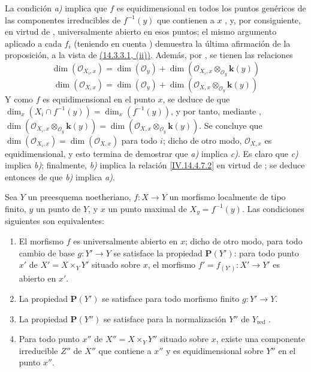 La condición \emph{a)} implica que $f$ es equidimensional en todos los puntos genéricos de las componentes irreducibles de $f^{-1}(y)$ que contienen a $x$ , y, por consiguiente, en virtud de , universalmente abierto en esos puntos; el mismo argumento aplicado a cada $f_i$ (teniendo en cuenta ) demuestra la última afirmación de la proposición, a la vista de {\hyperlink{ega4.c04.subsec.14-3-3-1}{(14.3.3.1, (ii))}}.
Además, por , se tienen las relaciones
\begin{equation}
\tag{14.4.7.1}
\label{IV.14.4.7.1-fr}
  \dim(\mathcal O_{X_i,x})=\dim(\mathcal O_y)+
  \dim(\mathcal O_{X_i,x}\otimes_{\mathcal O_y}\boldsymbol{k}(y))
\end{equation}
\begin{equation}
\tag{14.4.7.2}
\label{IV.14.4.7.2-fr}
  \dim(\mathcal O_{X,x})=\dim(\mathcal O_y)+
  \dim(\mathcal O_{X,x}\otimes_{\mathcal O_y}\boldsymbol{k}(y))
\end{equation}
Y como $f$ es equidimensional en el punto $x$, se deduce de  que $\dim_x(X_i\cap f^{-1}(y))=\dim_x(f^{-1}(y))$, y por tanto, mediante , $\dim(\mathcal O_{X_i,x}\otimes_{\mathcal O_y}\boldsymbol{k}(y))=
\dim(\mathcal O_{X,x}\otimes_{\mathcal O_y}\boldsymbol{k}(y))$.
Se concluye que $\dim(\mathcal O_{X_i,x})=\dim(\mathcal O_{X,x})$ para todo $i$; dicho de otro modo, $\mathcal O_{X,x}$ es equidimensional, y esto termina de demostrar que \emph{a)} implica \emph{c)}.
Es claro que \emph{c)} implica \emph{b)}; finalmente, \emph{b)} implica la relación \eqref{IV.14.4.7.2} en virtud de ; se deduce entonces de  que \emph{b)} implica \emph{a)}.

\begin{proposition}[14.4.8]
\label{IV.14.4.8}
Sea $Y$ un preesquema noetheriano, $f:X\to Y$ un morfismo localmente de tipo finito, $y$ un punto de $Y$, y $x$ un punto maximal de $X_y=f^{-1}(y)$.
Las condiciones siguientes son equivalentes:
\begin{enumerate}[label=\emph{\alph*)}]
  \item El morfismo $f$ es universalmente abierto en $x$; dicho de otro modo, para \textup{todo} cambio de base $g:Y'\to Y$ se satisface la propiedad $\boldsymbol{P}(Y')$: para todo punto $x'$ de $X'=X\times_Y Y'$ situado sobre $x$, el morfismo $f'=f_{(Y')}:X'\to Y'$ es abierto en $x'$.
  \item[\emph{a$'$)}] La propiedad $\boldsymbol{P}(Y')$ se satisface para todo morfismo \textup{finito} $g:Y'\to Y$.
  \item[\emph{a$''$)}] La propiedad $\boldsymbol{P}(Y'')$ se satisface para la \textup{normalización} $Y''$ de $Y_{\mathrm{red}}$ .
  \item Para todo punto $x''$ de $X''=X\times_Y Y''$ situado sobre $x$, existe una componente irreducible $Z''$ de $X''$ que contiene a $x''$ y es equidimensional sobre $Y''$ en el punto $x''$.
\end{enumerate}
\end{proposition}

